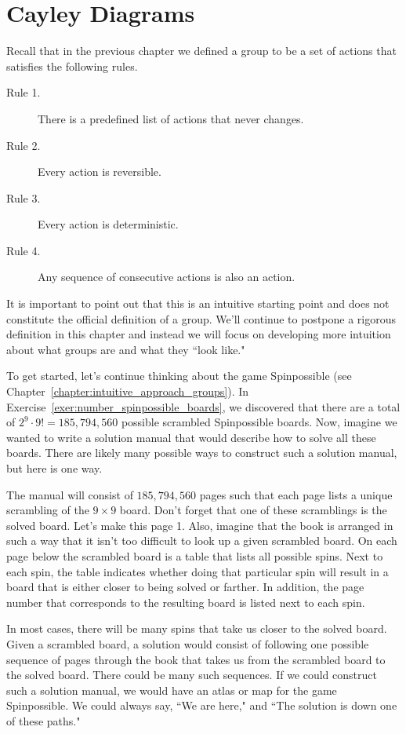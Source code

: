 \chapter{Cayley Diagrams}
\label{chapter:cayley_diagrams}
\thispagestyle{empty}

Recall that in the previous chapter we defined a group to be a set of actions that satisfies the following rules.

\begin{description}
\item[Rule 1.] There is a predefined list of actions that never changes.
\item[Rule 2.] Every action is reversible.
\item[Rule 3.] Every action is deterministic.
\item[Rule 4.] Any sequence of consecutive actions is also an action.
\end{description}

It is important to point out that this is an intuitive starting point and does not constitute the official definition of a group.  We'll continue to postpone a rigorous definition in this chapter and instead we will focus on developing more intuition about what groups are and what they ``look like."  

To get started, let's continue thinking about the game Spinpossible (see Chapter~\ref{chapter:intuitive_approach_groups}).  In Exercise~\ref{exer:number_spinpossible_boards}, we discovered that there are a total of $2^9\cdot 9! = 185,794,560$ possible scrambled Spinpossible boards.  Now, imagine we wanted to write a solution manual that would describe how to solve all these boards.  There are likely many possible ways to construct such a solution manual, but here is one way.  

The manual will consist of $185,794,560$ pages such that each page lists a unique scrambling of the $9\times 9$ board.  Don't forget that one of these scramblings is the solved board.  Let's make this page 1.  Also, imagine that the book is arranged in such a way that it isn't too difficult to look up a given scrambled board.  On each page below the scrambled board is a table that lists all possible spins.  Next to each spin, the table indicates whether doing that particular spin will result in a board that is either closer to being solved or farther.  In addition, the page number that corresponds to the resulting board is listed next to each spin.

In most cases, there will be many spins that take us closer to the solved board.  Given a scrambled board, a solution would consist of following one possible sequence of pages through the book that takes us from the scrambled board to the solved board.  There could be many such sequences.  If we could construct such a solution manual, we would have an atlas or map for the game Spinpossible.  We could always say, ``We are here," and ``The solution is down one of these paths."

